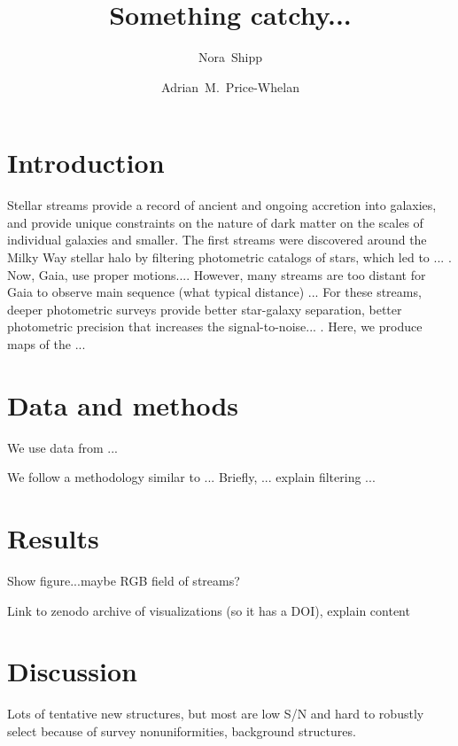 \documentclass[RNAAS]{aastex63}
\begin{document}
\title{Something catchy...}

\author[0000-0003-2497-091X]{Nora~Shipp}

\author[0000-0003-0872-7098]{Adrian~M.~Price-Whelan}


\section{Introduction}

Stellar streams provide a record of ancient and ongoing accretion into galaxies,
and provide unique constraints on the nature of dark matter on the scales of
individual galaxies and smaller.
The first streams were discovered around the Milky Way stellar halo by filtering photometric catalogs of stars, which led to ... \citep{Grillmair}.
Now, Gaia, use proper motions...\citep{Ibata,Malhan}.
However, many streams are too distant for Gaia to observe main sequence (what typical distance) ...
For these streams, deeper photometric surveys provide better star-galaxy separation, better photometric precision that increases the signal-to-noise... \citep{Belokurov:2007, Bernard:20??, Shipp:2018}.
Here, we produce maps of the ...


\section{Data and methods}

We use data from ...

We follow a methodology similar to \cite{Shipp:2018}...
Briefly, ... explain filtering ...


\section{Results}

Show figure...maybe RGB field of streams?

Link to zenodo archive of visualizations (so it has a DOI), explain content


\section{Discussion}

Lots of tentative new structures, but most are low S/N and hard to robustly select because of survey nonuniformities, background structures.
\end{document}
